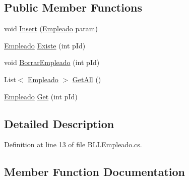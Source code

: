 \subsection*{Public Member Functions}
\begin{DoxyCompactItemize}
\item 
void \hyperlink{classprj_progra_i_i_i_1_1_layer_1_1_business___logic_1_1_b_l_l_empleado_a80ef323c864712e491fa040752455d0e}{Insert} (\hyperlink{classprj_progra_i_i_i_1_1_layer_1_1_entities_1_1_empleado}{Empleado} param)
\item 
\hyperlink{classprj_progra_i_i_i_1_1_layer_1_1_entities_1_1_empleado}{Empleado} \hyperlink{classprj_progra_i_i_i_1_1_layer_1_1_business___logic_1_1_b_l_l_empleado_a48d3674dd0f14fd4e3a95f6fdcea4467}{Existe} (int p\+Id)
\item 
void \hyperlink{classprj_progra_i_i_i_1_1_layer_1_1_business___logic_1_1_b_l_l_empleado_a1a8bb078f6d78bb7a1153f25b9006c73}{Borrar\+Empleado} (int p\+Id)
\item 
List$<$ \hyperlink{classprj_progra_i_i_i_1_1_layer_1_1_entities_1_1_empleado}{Empleado} $>$ \hyperlink{classprj_progra_i_i_i_1_1_layer_1_1_business___logic_1_1_b_l_l_empleado_a78943295f86576befb00a28f59f64b07}{Get\+All} ()
\item 
\hyperlink{classprj_progra_i_i_i_1_1_layer_1_1_entities_1_1_empleado}{Empleado} \hyperlink{classprj_progra_i_i_i_1_1_layer_1_1_business___logic_1_1_b_l_l_empleado_abf66d9719a5e3c0f1914f0ae0d4ef671}{Get} (int p\+Id)
\end{DoxyCompactItemize}


\subsection{Detailed Description}


Definition at line 13 of file B\+L\+L\+Empleado.\+cs.



\subsection{Member Function Documentation}
\hypertarget{classprj_progra_i_i_i_1_1_layer_1_1_business___logic_1_1_b_l_l_empleado_a1a8bb078f6d78bb7a1153f25b9006c73}{}\label{classprj_progra_i_i_i_1_1_layer_1_1_business___logic_1_1_b_l_l_empleado_a1a8bb078f6d78bb7a1153f25b9006c73} 

